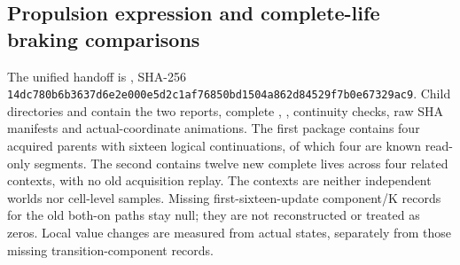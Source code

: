 \subsection*{Propulsion expression and complete-life braking comparisons}
The unified handoff is , SHA-256 \texttt{14dc780b\allowbreak{}6b3637d6\allowbreak{}e2e000e5\allowbreak{}d2c1af76\allowbreak{}850bd150\allowbreak{}4a862d84\allowbreak{}529f7b0e\allowbreak{}67329ac9}. Child directories  and  contain the two reports, complete , , continuity checks, raw SHA manifests and actual-coordinate animations. The first package contains four acquired parents with sixteen logical continuations, of which four are known read-only segments. The second contains twelve new complete lives across four related contexts, with no old acquisition replay. The contexts are neither independent worlds nor cell-level samples. Missing first-sixteen-update component/K records for the old both-on paths stay null; they are not reconstructed or treated as zeros. Local value changes are measured from actual states, separately from those missing transition-component records.

